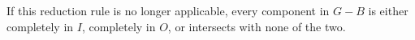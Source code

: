 \begin{theorem}
\begin{lemma}
\begin{theorem}
\begin{lemma}
\begin{reduction*}
If this reduction rule is no longer applicable, every component in $G-B$ is either completely in $I$, completely in $O$, or intersects with none of the two. %





\end{reduction*}
\end{lemma}
\end{theorem}
\end{lemma}
\end{theorem}
